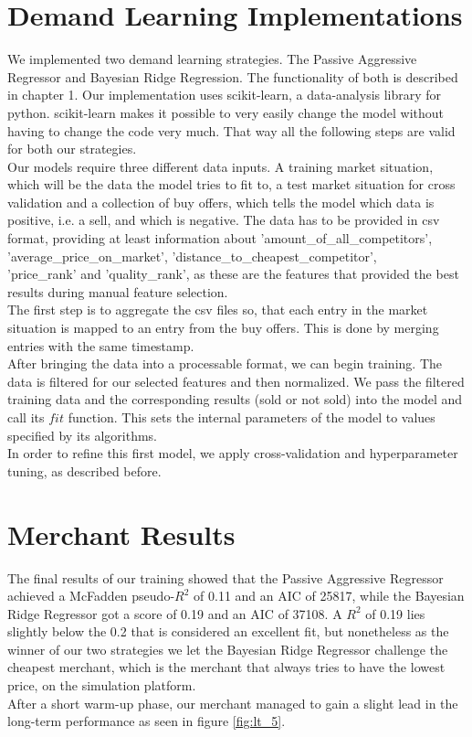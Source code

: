 \documentclass[sigconf]{acmart}
\begin{document}
\section*{Demand Learning Implementations}
We implemented two demand learning strategies. The Passive Aggressive Regressor and Bayesian Ridge Regression. The functionality of both is described in chapter 1. Our implementation uses scikit-learn, a data-analysis library for python. scikit-learn makes it possible to very easily change the model without having to change the code very much. That way all the following steps are valid for both our strategies.\\
Our models require three different data inputs. A training market situation, which will be the data the model tries to fit to, a test market situation for cross validation and a collection of buy offers, which tells the model which data is positive, i.e. a sell, and which is negative. The data has to be provided in csv format, providing at least information about 'amount\_of\_all\_competitors', 'average\_price\_on\_market', 'distance\_to\_cheapest\_competitor',\\
'price\_rank' and 'quality\_rank', as these are the features that provided the best results during manual feature selection.\\
The first step is to aggregate the csv files so, that each entry in the market situation is mapped to an entry from the buy offers. This is done by merging entries with the same timestamp.\\
After bringing the data into a processable format, we can begin training. The data is filtered for our selected features and then normalized. We pass the filtered training data and the corresponding results (sold or not sold) into the model and call its $fit$ function. This sets the internal parameters of the model to values specified by its algorithms.\\
In order to refine this first model, we apply cross-validation and hyperparameter tuning, as described before.

\section*{Merchant Results}
The final results of our training showed that the Passive Aggressive Regressor achieved a McFadden pseudo-$R^2$ of 0.11 and an AIC of 25817, while the Bayesian Ridge Regressor got a score of 0.19 and an AIC of 37108. A $R^2$ of 0.19 lies slightly below the 0.2 that is considered an excellent fit, but nonetheless as the winner of our two strategies we let the Bayesian Ridge Regressor challenge the cheapest merchant, which is the merchant that always tries to have the lowest price, on the simulation platform.\\
After a short warm-up phase, our merchant managed to gain a slight lead in the long-term performance as seen in figure \ref{fig:lt_5}.
\end{document}

